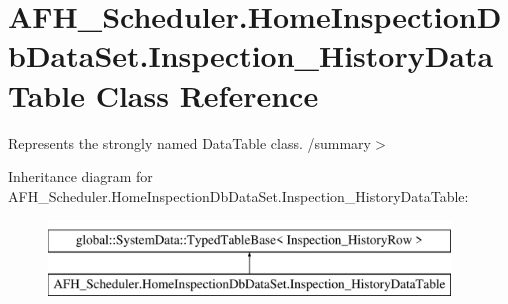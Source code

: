 \section{A\+F\+H\+\_\+\+Scheduler.\+Home\+Inspection\+Db\+Data\+Set.\+Inspection\+\_\+\+History\+Data\+Table Class Reference}
\label{class_a_f_h___scheduler_1_1_home_inspection_db_data_set_1_1_inspection___history_data_table}


Represents the strongly named Data\+Table class. /summary$>$  


Inheritance diagram for A\+F\+H\+\_\+\+Scheduler.\+Home\+Inspection\+Db\+Data\+Set.\+Inspection\+\_\+\+History\+Data\+Table\+:\begin{figure}[H]
\begin{center}
\leavevmode
\includegraphics[height=2.000000cm]{class_a_f_h___scheduler_1_1_home_inspection_db_data_set_1_1_inspection___history_data_table}
\end{center}
\end{figure}
